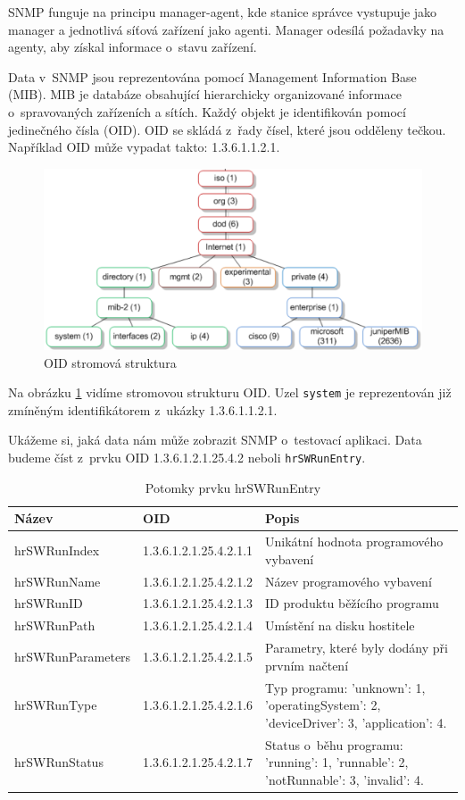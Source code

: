  SNMP funguje na principu manager-agent, kde stanice správce vystupuje jako manager a jednotlivá síťová zařízení jako agenti. Manager odesílá požadavky na agenty, aby získal informace o~stavu zařízení.

 Data v~SNMP jsou reprezentována pomocí Management Information Base (MIB). MIB je databáze obsahující hierarchicky organizované informace o~spravovaných zařízeních a sítích. Každý objekt je identifikován pomocí jedinečného čísla (OID). OID se skládá z~řady čísel, které jsou odděleny tečkou. Například OID může vypadat takto: 1.3.6.1.1.2.1.

 \begin{figure}[H]
  \centering
  \includegraphics[width=15cm]{obrazky-figures/mib.png}
  \caption{OID stromová struktura}
  \label{fig:mib}
\end{figure}

Na obrázku \ref{fig:mib} vidíme stromovou strukturu OID. Uzel \texttt{system} je reprezentován již zmíněným identifikátorem z~ukázky 1.3.6.1.1.2.1.

Ukážeme si, jaká data nám může zobrazit SNMP o~testovací aplikaci. Data budeme číst z~prvku OID 1.3.6.1.2.1.25.4.2 neboli \texttt{hrSWRunEntry}.

\begin{table}[H]
\centering
\begin{tabular}{|p{3.5cm}|p{3.4cm}|p{5.8cm}|}
\hline
\textbf{Název} & \textbf{OID} & \textbf{Popis} \\ \hline
hrSWRunIndex & 1.3.6.1.2.1.25.4.2.1.1 & Unikátní hodnota programového vybavení \\ \hline
hrSWRunName & 1.3.6.1.2.1.25.4.2.1.2 & Název programového vybavení \\ \hline
hrSWRunID & 1.3.6.1.2.1.25.4.2.1.3 & ID produktu běžícího programu\\ \hline
hrSWRunPath & 1.3.6.1.2.1.25.4.2.1.4 & Umístění na disku hostitele\\ \hline
hrSWRunParameters & 1.3.6.1.2.1.25.4.2.1.5 & Parametry, které byly dodány při prvním načtení\\ \hline
hrSWRunType & 1.3.6.1.2.1.25.4.2.1.6 & Typ programu: 'unknown': 1, 'operatingSystem': 2, 'deviceDriver': 3, 'application': 4. \\ \hline
hrSWRunStatus & 1.3.6.1.2.1.25.4.2.1.7 & Status o~běhu programu: 'running': 1, 'runnable': 2, 'notRunnable': 3, 'invalid': 4. \\ \hline
\end{tabular}
\caption{Potomky prvku hrSWRunEntry}
\end{table}

